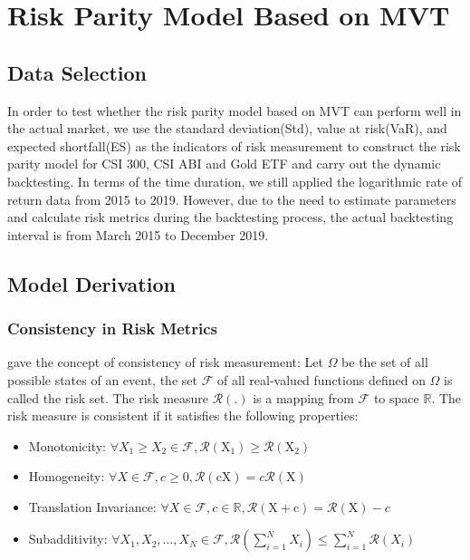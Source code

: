 \section{Risk Parity Model Based on MVT}
\subsection{Data Selection}
In order to test whether the risk parity model based on MVT can perform well in the actual market, we use the standard deviation(Std), value at risk(VaR), and expected shortfall(ES) as the indicators of risk measurement to construct the risk parity model for CSI 300, CSI ABI and Gold ETF and carry out the dynamic backtesting. In terms of the time duration, we still applied the logarithmic rate of return data from 2015 to 2019. However, due to the need to estimate parameters and calculate risk metrics during the backtesting process, the actual backtesting interval is from March 2015 to December 2019.

\subsection{Model Derivation}
\subsubsection{Consistency in Risk Metrics}
\cite{AP1999Coherentmeasures} gave the concept of consistency of risk measurement: Let $\Omega$ be the set of all possible states of an event, the set $\mathcal{F}$ of all real-valued functions defined on $\Omega$ is called the risk set. The risk measure $\boldsymbol{\mathcal{R}}(.)$ is a mapping from $\mathcal{F}$ to space $\mathbb{R}$. The risk measure is consistent if it satisfies the following properties: 
\begin{itemize}
  \item Monotonicity: $\forall X_1 \geq X_2 \in \mathcal{F}, \mathcal{R}\left(\mathrm{X}_1\right) \geq \mathcal{R}\left(\mathrm{X}_2\right)$ 
  \item Homogeneity: $\forall X \in \mathcal{F}, c \geq 0, \mathcal{R}(\mathrm{cX})=c \mathcal{R}(\mathrm{X})$
  \item Translation Invariance: $\forall X \in \mathcal{F}, c \in \mathbb{R}, \mathcal{R}(\mathrm{X}+\mathrm{c})=\mathcal{R}(\mathrm{X})-c$ 
  \item Subadditivity: $\forall X_1, X_2, \ldots, X_N \in \mathcal{F}, \mathcal{R}\left( \sum_{i=1}^{N} X_i\right) \leq \sum_{i=1}^{N} \mathcal{R}\left(X_i\right)$
\end{itemize}

